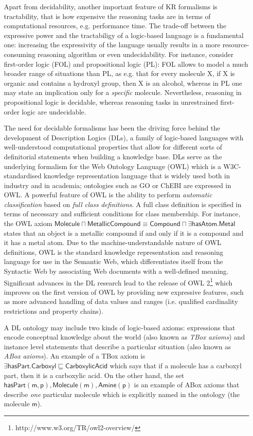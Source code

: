 \documentclass[10pt]{bmc_article}
\newenvironment{bmcformat}{\baselineskip20pt\sloppy\setboolean{publ}{false}}{\baselineskip20pt\sloppy}
\begin{document}
\begin{bmcformat}
Apart from decidability, another important feature of KR formalisms is tractability, that is how expensive the reasoning tasks are in terms of computational resources, e.g. performance time. The trade-off between the expressive power and the tractabiligy of a logic-based language  is a fundamental one: increasing the expressivity of the language usually results in a more resource-consuming reasoning algorithm or even undecidability. For instance, consider first-order logic (FOL) and propositional logic (PL): FOL allows to model a much broader range of situations than PL, as e.g. that for every molecule X, if X is organic and contains a hydroxyl group, then X is an alcohol, whereas in PL one may state an implication only for a \emph{specific} molecule. Nevertheless, reasoning in propositional logic is decidable, whereas reasoning tasks in unrestrained first-order logic are undecidable.

The need for decidable formalisms has been the driving force behind the development of Description Logics (DLs), a family of logic-based languages with well-understood computational properties that allow for different sorts of definitorial statements when building a knowledge base. DLs serve as the underlying formalism for the Web Ontology Language (OWL) which is a W3C-standardised  knowledge representation language that is widely used both in industry and in academia; ontologies such as GO or ChEBI are expressed in OWL. A powerful feature of OWL is the ability to perform \emph{automatic classification} based on \emph{full class definitions}. A full class definition is specified in terms of necessary and sufficient conditions for class membership. For instance, the OWL axiom $\mathsf{Molecule \sqcap MetallicCompound} \equiv \mathsf{Compound \sqcap \exists hasAtom.Metal}$ states that an object is a metallic compound if and only if it is a compound and it has a metal atom. Due to the machine-understandable nature of OWL definitions, OWL is the standard knowledge representation and reasoning language for use in the Semantic Web, which differentiates itself from the Syntactic Web by associating Web documents with a well-defined meaning. Significant advances in the DL research lead to the release of OWL 2\footnote{http://www.w3.org/TR/owl2-overview/} which improves on the first version of OWL by providing new expressive features, such as more advanced handling of data values and ranges (i.e. qualified cardinality restrictions and property chains).

A DL ontology may include two kinds of logic-based axioms: expressions that encode conceptual knowledge about the world (also known as \emph{TBox axioms}) and instance level statements that describe a particular situation (also known as \emph{ABox axioms}). An example of a TBox axiom is $ \mathsf{ \exists hasPart.Carboxyl} \sqsubseteq \mathsf{CarboxylicAcid}$ which says that if a molecule has a carboxyl part, then it is a carboxylic acid. On the other hand, the set $\mathsf{hasPart(m,p),Molecule(m),Amine(p)}$ is an example of ABox axioms that describe \emph{one} particular molecule which is explicitly named in the ontology (the molecule $\mathsf{m}$).


\end{bmcformat}
\end{document}
